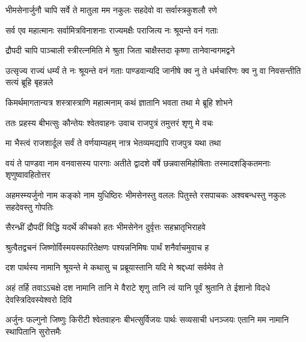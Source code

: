 \twolineshloka
{भीमसेनार्जुनौ चापि सर्वे ते मातुला मम}
{नकुलः सहदेवो वा सर्वास्त्रकुशलौ रणे}


\twolineshloka
{सर्व एव महात्मानः सर्वामित्रविनाशनाः}
{राज्यमक्षैः पराजित्य नः श्रूयन्ते वनं गताः}


\twolineshloka
{द्रौपदी चापि पाञ्चाली स्त्रीरत्नमिति मे श्रुता}
{जिता चाक्षैस्तदा कृष्णा तानेवान्वगमद्वने}


\onelineshloka
{उत्सृज्य राज्यं धर्म्यं ते नः श्रूयन्ते वनं गताः}
\twolineshloka
{पाण्डवान्यदि जानीषे क्व नु ते धर्मचारिणः}
{क्व नु वा निवसन्तीति सत्यं ब्रूहि बृहन्नले}


\twolineshloka
{किमर्थमागतान्यत्र शस्त्रास्त्राणि महात्मनाम्}
{कथं ज्ञातानि भवता तथा मे ब्रूहि शोभने}



\twolineshloka
{ततः प्रहस्य बीभत्सुः कौन्तेयः श्वेतवाहनः}
{उवाच राजपुत्रं तमुत्तरं शृणु मे वचः}


\twolineshloka
{मा भैस्त्वं राजशार्दूल सर्वं ते वर्णयाम्यहम्}
{नात्र भेतव्यमद्यापि राजपुत्र यथा तथा}


\threelineshloka
{वयं ते पाण्डवा नाम वनवासस्य पारगाः}
{अतीते द्वादशे वर्षे छन्नवासमिहोषिताः}
{तस्मादशङ्कितमनाः शृणुष्वावहितोत्तर}


\threelineshloka
{अहमस्म्यर्जुनो नाम कङ्को नाम युधिष्ठिरः}
{भीमसेनस्तु वललः पितुस्ते रसपाचकः}
{अश्वबन्धस्तु नकुलः सहदेवस्तु गोपतिः}


\twolineshloka
{सैरन्ध्रीं द्रौपदीं विद्धि यदर्थे कीचको हतः}
{भीमसेनेन दुर्वृत्तः सहभ्रातृभिराहवे}


\twolineshloka
{श्रुत्वैतद्वचनं जिष्णोर्विस्मयस्फारितेक्षणः}
{पश्यन्ननिमिषः पार्थं शनैर्वाचमुवाच ह}




\twolineshloka
{दश पार्थस्य नामानि श्रूयन्ते मे कथासु च}
{प्रब्रूयास्तानि यदि मे श्रद्दध्यां सर्वमेव ते}




\threelineshloka
{अहं तर्हि तवाऽऽचक्षे दश नामानि तानि मे}
{वैराटे शृणु तानि त्वं यानि पूर्वं श्रुतानि ते}
{ईशानो विदधे देवस्त्रिदिवस्येश्वरो दिवि}


\threelineshloka
{अर्जुनः फल्गुनो जिष्णुः किरीटी श्वेतवाहनः}
{बीभत्सुर्विजयः पार्थः सव्यसाची धनञ्जयः}
{एतानि मम नामानि स्थापितानि सुरोत्तमैः}





